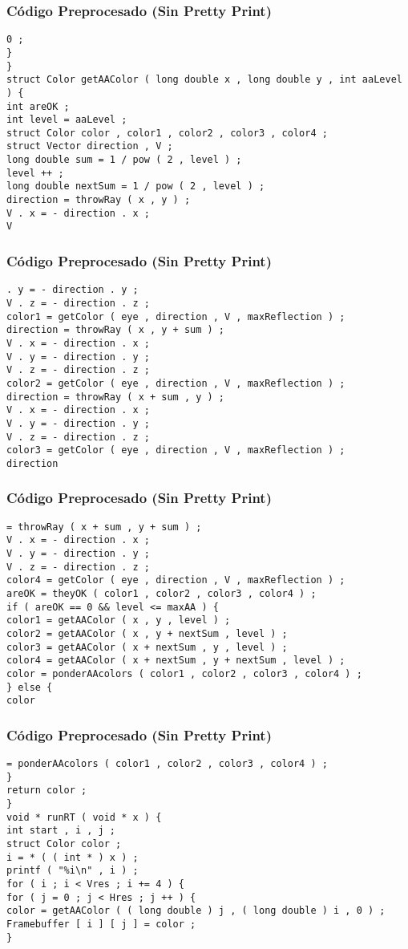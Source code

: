 \documentclass{beamer}
\begin{document}
\begin{frame}[fragile]
\frametitle{C\'odigo Preprocesado (Sin Pretty Print)}
\begin{lstlisting}[style=CStyle]
0 ; 
} 
} 
struct Color getAAColor ( long double x , long double y , int aaLevel ) { 
int areOK ; 
int level = aaLevel ; 
struct Color color , color1 , color2 , color3 , color4 ; 
struct Vector direction , V ; 
long double sum = 1 / pow ( 2 , level ) ; 
level ++ ; 
long double nextSum = 1 / pow ( 2 , level ) ; 
direction = throwRay ( x , y ) ; 
V . x = - direction . x ; 
V \end{lstlisting}
\end{frame}
\begin{frame}[fragile]
\frametitle{C\'odigo Preprocesado (Sin Pretty Print)}
\begin{lstlisting}[style=CStyle]
. y = - direction . y ; 
V . z = - direction . z ; 
color1 = getColor ( eye , direction , V , maxReflection ) ; 
direction = throwRay ( x , y + sum ) ; 
V . x = - direction . x ; 
V . y = - direction . y ; 
V . z = - direction . z ; 
color2 = getColor ( eye , direction , V , maxReflection ) ; 
direction = throwRay ( x + sum , y ) ; 
V . x = - direction . x ; 
V . y = - direction . y ; 
V . z = - direction . z ; 
color3 = getColor ( eye , direction , V , maxReflection ) ; 
direction \end{lstlisting}
\end{frame}
\begin{frame}[fragile]
\frametitle{C\'odigo Preprocesado (Sin Pretty Print)}
\begin{lstlisting}[style=CStyle]
= throwRay ( x + sum , y + sum ) ; 
V . x = - direction . x ; 
V . y = - direction . y ; 
V . z = - direction . z ; 
color4 = getColor ( eye , direction , V , maxReflection ) ; 
areOK = theyOK ( color1 , color2 , color3 , color4 ) ; 
if ( areOK == 0 && level <= maxAA ) { 
color1 = getAAColor ( x , y , level ) ; 
color2 = getAAColor ( x , y + nextSum , level ) ; 
color3 = getAAColor ( x + nextSum , y , level ) ; 
color4 = getAAColor ( x + nextSum , y + nextSum , level ) ; 
color = ponderAAcolors ( color1 , color2 , color3 , color4 ) ; 
} else { 
color \end{lstlisting}
\end{frame}
\begin{frame}[fragile]
\frametitle{C\'odigo Preprocesado (Sin Pretty Print)}
\begin{lstlisting}[style=CStyle]
= ponderAAcolors ( color1 , color2 , color3 , color4 ) ; 
} 
return color ; 
} 
void * runRT ( void * x ) { 
int start , i , j ; 
struct Color color ; 
i = * ( ( int * ) x ) ; 
printf ( "%i\n" , i ) ; 
for ( i ; i < Vres ; i += 4 ) { 
for ( j = 0 ; j < Hres ; j ++ ) { 
color = getAAColor ( ( long double ) j , ( long double ) i , 0 ) ; 
Framebuffer [ i ] [ j ] = color ; 
} \end{lstlisting}
\end{frame}
\end{document}

